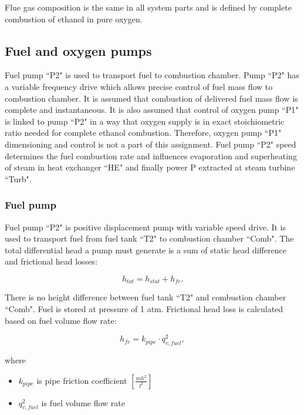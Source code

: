 \documentclass{article}
\begin{document}
	\noindent
	Flue gas composition is the same in all system parts and is defined by complete combustion of ethanol in pure oxygen.
	
	\subsection{Fuel and oxygen pumps}
	
	Fuel pump “P2" is used to transport fuel to combustion chamber. Pump “P2" has a variable frequency drive which allows precise control of fuel mass flow to combustion chamber. It is assumed that combustion of delivered fuel mass flow is complete and instantaneous. It is also assumed that control of oxygen pump “P1" is linked to pump “P2" in a way that oxygen supply is in exact stoichiometric ratio needed for complete ethanol combustion. Therefore, oxygen pump “P1" dimensioning and control is not a part of this assignment. 
	Fuel pump “P2" speed determines the fuel combustion rate and influences evaporation and superheating of steam in heat exchanger “HE" and finally power P extracted at steam turbine “Turb".
	
	\subsubsection*{Fuel pump}
	
	Fuel pump “P2" is positive displacement pump with variable speed drive. It is used to transport fuel from fuel tank “T2" to combustion chamber “Comb". The total differential head a pump must generate is a sum of static head difference and frictional head losses: 
	
	\begin{equation}\label{eq:head_total}
		h_{tot} = h_{stat} + h_{fr}.
	\end{equation}
	
	There is no height difference between fuel tank “T2" and combustion chamber “Comb". Fuel is stored at pressure of 1 atm.
	Frictional head loss is calculated based on fuel volume flow rate:
	
	\begin{equation}\label{eq:head_loss}
		h_{fr} = k_{pipe} \cdot q_{v,fuel}^2,
	\end{equation}
	
	\noindent
	where
	
	\begin{itemize}
		\item $k_{pipe}$ is pipe friction coefficient $\left[ \frac{mh^2}{l^2} \right]$
		\item $q_{v,fuel}^2$ is fuel volume flow rate
	\end{itemize}
\end{document}
